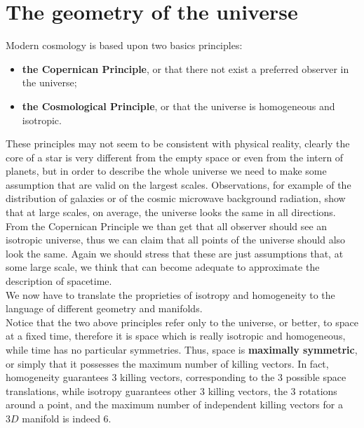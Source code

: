 \section{The geometry of the universe}
Modern cosmology is based upon two basics principles:
\begin{itemize}
    \item \textbf{the Copernican Principle}, or that there not exist a preferred observer in the universe;
    \item \textbf{the Cosmological Principle}, or that the universe is homogeneous and isotropic.
\end{itemize}
These principles may not seem to be consistent with physical reality, clearly the core of a star is very different from the empty space or even from the intern of planets, but in order to describe the whole universe we need to make some assumption that are valid on the largest scales. Observations, for example of the distribution of galaxies or of the cosmic microwave background radiation, show that at large scales, on average, the universe looks the same in all directions. From the Copernican Principle we than get that all observer should see an isotropic universe, thus we can claim that all points of the universe should also look the same. Again we should stress that these are just assumptions that, at some large scale, we think that can become adequate to approximate the description of spacetime.\\

We now have to translate the proprieties of isotropy and homogeneity to the language of different geometry and manifolds.\\ Notice that the two above principles refer only to the universe, or better, to space at a fixed time, therefore it is space which is really isotropic and homogeneous, while time has no particular symmetries.
Thus, space is \textbf{maximally symmetric}, or simply that it possesses the maximum number of killing vectors. In fact, homogeneity guarantees 3 killing vectors, corresponding to the 3 possible space translations, while isotropy guarantees other 3 killing vectors, the 3 rotations around a point, and the maximum number of independent killing vectors for a $3D$ manifold is indeed 6.
